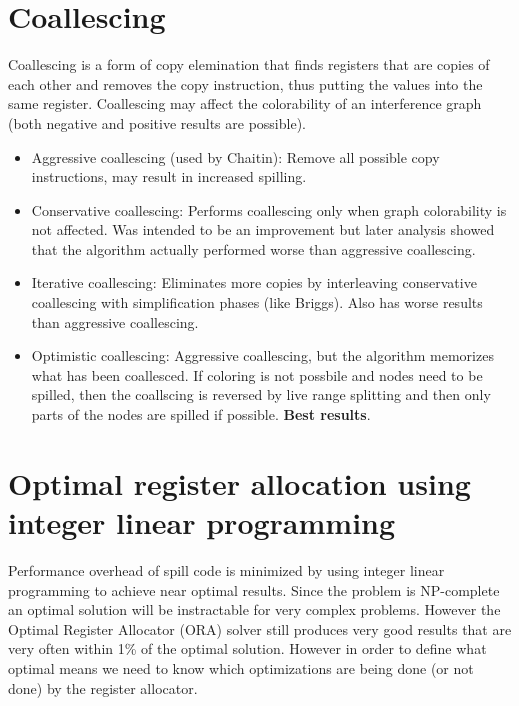 \documentclass[a4paper,10pt]{article}
\begin{document}
\section{Coallescing}
Coallescing is a form of copy elemination that finds registers that are copies of each other and removes the copy instruction, thus
putting the values into the same register. Coallescing may affect the colorability of an interference graph (both negative and positive
results are possible).
\begin{itemize}
 \item Aggressive coallescing (used by Chaitin): Remove all possible copy instructions, may result in increased spilling.
 \item Conservative coallescing: Performs coallescing only when graph colorability is not affected. Was intended to be an improvement but 
       later analysis showed that the algorithm actually performed worse than aggressive coallescing.
 \item Iterative coallescing: Eliminates more copies by interleaving conservative coallescing with simplification phases (like Briggs). 
       Also has worse results than aggressive coallescing.
 \item Optimistic coallescing: Aggressive coallescing, but the algorithm memorizes what has been coallesced. If coloring is not possbile 
       and nodes need to be spilled, then the coallscing is reversed by live range splitting and then only parts of the nodes are spilled 
       if possible. \textbf{Best results}.
\end{itemize}

\section{Optimal register allocation using integer linear programming}
Performance overhead of spill code is minimized by using integer linear programming to achieve near optimal results. Since the problem is 
NP-complete an optimal solution will be instractable for very complex problems. However the Optimal Register Allocator (ORA) solver still 
produces very good results that are very often within 1\% of the optimal solution. However in order to define what optimal means we need 
to know which optimizations are being done (or not done) by the register allocator.\\
\end{document}
